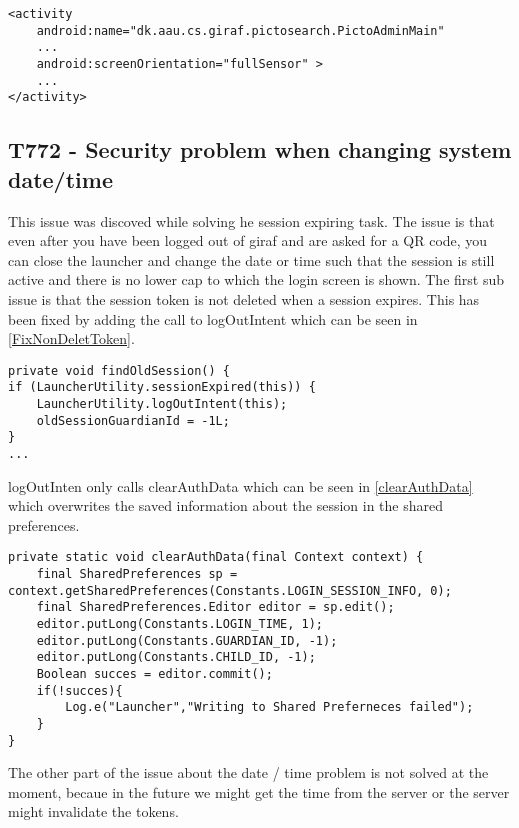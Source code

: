\begin{minipage}[H]{\linewidth}
\begin{lstlisting}[caption = Allowing changes to the screen orientation., label = OrientAllow] 
<activity
	android:name="dk.aau.cs.giraf.pictosearch.PictoAdminMain"
    ...
    android:screenOrientation="fullSensor" >
    ...
</activity>
\end{lstlisting}
\end{minipage}



\subsection{T772 - Security problem when changing system date/time}\label{T772}
This issue was discoved while solving he session expiring task. The issue is
that even after you have been logged out of giraf and are asked for a QR code,
you can close the launcher and change the date or time such that the session is
still active and there is no lower cap to which the login screen is shown. The
first sub issue is that the session token is not deleted when a session expires.
This has been fixed by adding the call to logOutIntent which can be seen in
\autoref{FixNonDeletToken}.\nl

\begin{minipage}[H]{\linewidth}
\begin{lstlisting}[caption = Our solution to not clearing the token, label =
FixNonDeletToken] 
private void findOldSession() {
if (LauncherUtility.sessionExpired(this)) {
	LauncherUtility.logOutIntent(this);
    oldSessionGuardianId = -1L;
}
...
\end{lstlisting} 
\end{minipage}

logOutInten only calls clearAuthData which can be seen in
\autoref{clearAuthData} which overwrites the saved information about the
session in the shared preferences.\nl

\begin{minipage}[H]{\linewidth}
\begin{lstlisting}[caption = ClearAuthData methode, label = clearAuthData]
private static void clearAuthData(final Context context) {
    final SharedPreferences sp = context.getSharedPreferences(Constants.LOGIN_SESSION_INFO, 0);
    final SharedPreferences.Editor editor = sp.edit();
    editor.putLong(Constants.LOGIN_TIME, 1);
    editor.putLong(Constants.GUARDIAN_ID, -1);
    editor.putLong(Constants.CHILD_ID, -1);
    Boolean succes = editor.commit();
    if(!succes){
    	Log.e("Launcher","Writing to Shared Preferneces failed");
    }
}
\end{lstlisting} 
\end{minipage}

The other part of the issue about the date / time problem is not solved at the
moment, becaue in the future we might get the time from the server or the server
might invalidate the tokens.
























